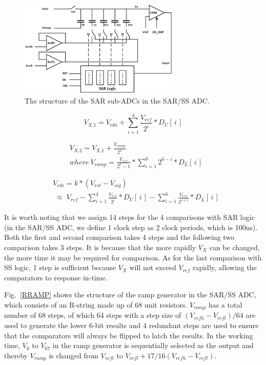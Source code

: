 \begin{figure}[htbp]
	\centerline{\includegraphics[width=3in]{./Figures/SAR.eps}}
	\caption{The structure of the SAR sub-ADCs in the SAR/SS ADC.}
	\label{SAR}
\end{figure}

\begin{equation}
	V_{X.1}=V_{cds}+\sum_{i=1}^{4} {\frac{V_{ref}}{2^{i}}\ast{D_{U}\left[\,i\,\right]}}
	\label{eq4}
\end{equation}

\begin{equation}
	\begin{aligned}
		&V_{X.2}=V_{X.1}+\frac{V_{ramp}}{2^4}\\ &where\  V_{ramp}=\frac{V_{ref}}{2^6-1}\ast\sum_{i=1}^{6}2^{6-i}\ast{D_{L}\left[\,i\,\right]}
		\label{eq5}
	\end{aligned}	
\end{equation}

\begin{equation}
	\begin{aligned}
		&V_{cds}=k\ast(V_{rst}-V_{sig})\\
		&\;{\approx}\;{V_{ref}-\sum_{i=1}^{4} \frac{V_{ref}}{2^{i}}\ast{D_{U}\left[\,i\,\right]}-\sum_{i=1}^{6} \frac{V_{ref}}{2^{4+i}}\ast{D_{L}\left[\,i\,\right]}}
		\label{eq6}
	\end{aligned}
\end{equation}

It is worth noting that we assign 14 steps for the 4 comparisons with SAR logic (in the SAR/SS ADC, we define 1 clock step as 2 clock periods, which is 100ns). Both the first and second comparison takes 4 steps and the following two comparison takes 3 steps. It is because that the more rapidly $V_{X}$ can be changed, the more time it may be required for comparison. As for the last comparison with SS logic, 1 step is sufficient because $V_{X}$ will not exceed $V_{ref}$ rapidly, allowing the comparators to response in-time.

Fig.~\ref{RRAMP} shows the structure of the ramp generator in the SAR/SS ADC, which consists of an R-string made up of 68 unit resistors. $V_{ramp}$ has a total number of 68 steps,
of which 64 steps with a step size of $(V_{refh}-V_{refl})/64$ are used to generate the lower 6-bit results and 4 redundant steps are used to ensure that the comparators 
will always be flipped to latch the results. In the working time, $V_{0}$ to $V_{67}$ in the ramp generator is sequentially selected as the output and thereby 
$V_{ramp}$ is changed from $V_{vefl}$ to $V_{vefl}+17/16(V_{refh}-V_{refl})$.

